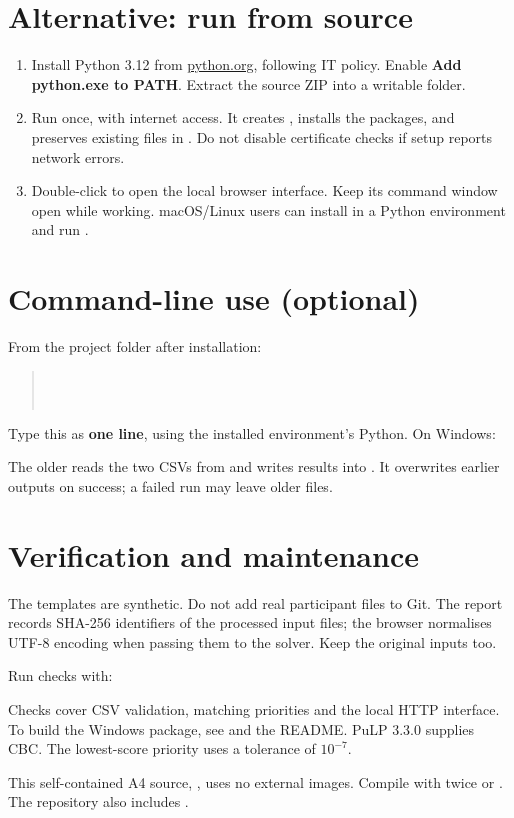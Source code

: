 \documentclass[11pt,a4paper]{article}
\begin{document}
\section*{Alternative: run from source}
\begin{enumerate}
\item Install Python 3.12 from \href{https://www.python.org/downloads/}{python.org}, following IT policy. Enable \textbf{Add python.exe to PATH}. Extract the source ZIP into a writable folder.
\item Run  once, with internet access. It creates , installs the packages, and preserves existing files in . Do not disable certificate checks if setup reports network errors.
\item Double-click  to open the local browser interface. Keep its command window open while working. macOS/Linux users can install  in a Python environment and run .
\end{enumerate}

\section*{Command-line use (optional)}
From the project folder after installation:
\begin{quote}\small
{}\\
\\
\end{quote}
Type this as \textbf{one line}, using the installed environment's Python. On Windows:\par
{\small{}}\par
The older  reads the two CSVs from  and writes results into . It overwrites earlier outputs on success; a failed run may leave older files.

\section*{Verification and maintenance}
The templates are synthetic. Do not add real participant files to Git. The report records SHA-256 identifiers of the processed input files; the browser normalises UTF-8 encoding when passing them to the solver. Keep the original inputs too.

Run checks with:\par
{\small{}}\par
Checks cover CSV validation, matching priorities and the local HTTP interface. To build the Windows package, see  and the README. PuLP 3.3.0 supplies CBC. The lowest-score priority uses a tolerance of $10^{-7}$.

This self-contained A4 source, , uses no external images. Compile with  twice or . The repository also includes .
\end{document}
